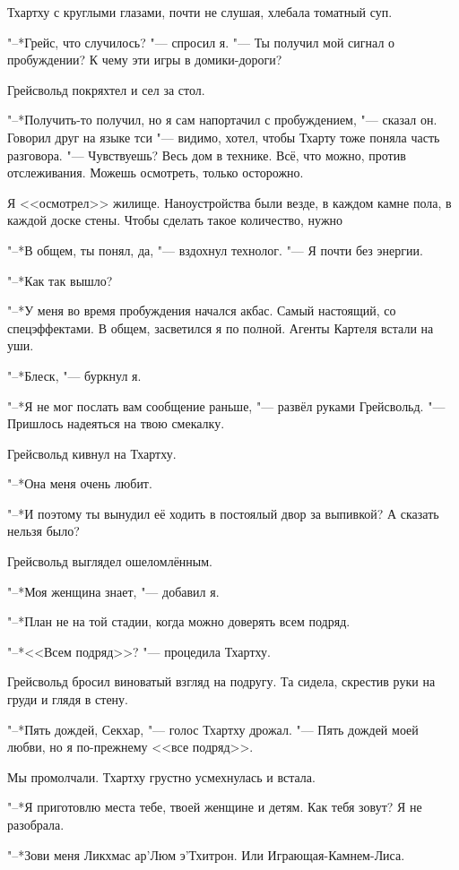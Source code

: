 \documentclass[a4paper,10pt,fleqn]{book}
\newcommand{\ldotst}{\so{...}\xspace}
\begin{document}
Тхартху с круглыми глазами, почти не слушая, хлебала томатный суп.

"--*Грейс, что случилось? "--- спросил я.
"--- Ты получил мой сигнал о пробуждении?
К чему эти игры в домики-дороги?

Грейсвольд покряхтел и сел за стол.

"--*Получить-то получил, но я сам напортачил с пробуждением, "--- сказал он.
Говорил друг на языке тси "--- видимо, хотел, чтобы Тхарту тоже поняла часть разговора.
"--- Чувствуешь?
Весь дом в технике.
Всё, что можно, против отслеживания.
Можешь осмотреть, только осторожно.

Я <<осмотрел>> жилище.
Наноустройства были везде, в каждом камне пола, в каждой доске стены.
Чтобы сделать такое количество, нужно\ldotst

"--*В общем, ты понял, да, "--- вздохнул технолог.
"--- Я почти без энергии.

"--*Как так вышло?

"--*У меня во время пробуждения начался акбас.
Самый настоящий, со спецэффектами.
В общем, засветился я по полной.
Агенты Картеля встали на уши.

"--*Блеск, "--- буркнул я.

"--*Я не мог послать вам сообщение раньше, "--- развёл руками Грейсвольд.
"--- Пришлось надеяться на твою смекалку.

Грейсвольд кивнул на Тхартху.

"--*Она меня очень любит.

"--*И поэтому ты вынудил её ходить в постоялый двор за выпивкой?
А сказать нельзя было?

Грейсвольд выглядел ошеломлённым.

"--*Моя женщина знает, "--- добавил я.

"--*План не на той стадии, когда можно доверять всем подряд.

"--*<<Всем подряд>>? "--- процедила Тхартху.

Грейсвольд бросил виноватый взгляд на подругу.
Та сидела, скрестив руки на груди и глядя в стену.

"--*Пять дождей, Секхар, "--- голос Тхартху дрожал.
"--- Пять дождей моей любви, но я по-прежнему <<все подряд>>.

Мы промолчали.
Тхартху грустно усмехнулась и встала.

"--*Я приготовлю места тебе, твоей женщине и детям.
Как тебя зовут?
Я не разобрала.

"--*Зови меня Ликхмас ар'Люм э'Тхитрон.
Или Играющая-Камнем-Лиса.
\end{document}
